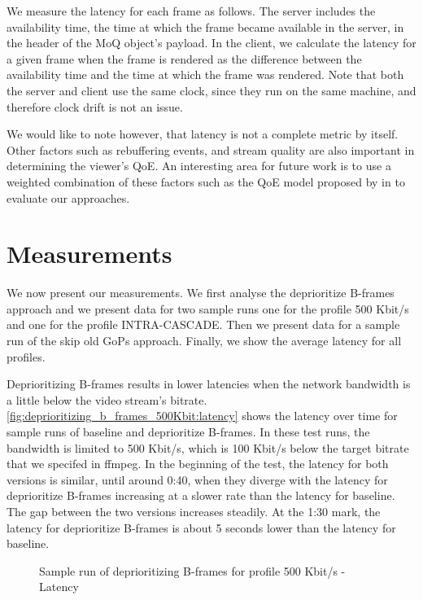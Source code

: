 We measure the latency for each frame as follows. The server includes the availability time, the time at which the frame became available in the server, in the header of the MoQ object's payload. In the client, we calculate the latency for a given frame when the frame is rendered as the difference between the availability time and the time at which the frame was rendered. Note that both the server and client use the same clock, since they run on the same machine, and therefore clock drift is not an issue.

We would like to note however, that latency is not a complete metric by itself. Other factors such as rebuffering events, and stream quality are also important in determining the viewer's \ac{QoE}. An interesting area for future work is to use a weighted combination of these factors such as the \ac{QoE} model proposed by \citeauthor{yinControlTheoreticApproachDynamic2015} in \parencite{yinControlTheoreticApproachDynamic2015} to evaluate our approaches.

\section{Measurements}
We now present our measurements. We first analyse the deprioritize B-frames approach and we present data for two sample runs
one for the profile 500 Kbit/s and one for the profile INTRA-CASCADE. Then we present data for a sample run of the skip old
GoPs approach. Finally, we show the average latency for all profiles. 

Deprioritizing B-frames results in lower latencies when the network bandwidth is a little below the video stream's
bitrate. \autoref{fig:deprioritizing_b_frames_500Kbit:latency} shows the latency over time for sample runs of baseline and
deprioritize B-frames. In these test runs, the bandwidth is limited to 500 Kbit/s, which is 100 Kbit/s below the
target bitrate that we specifed in ffmpeg. In the beginning of the test, the latency for both versions is similar,
until around 0:40, when they diverge with the latency for deprioritize B-frames increasing at a slower rate than
the latency for baseline. The gap between the two versions increases steadily. At the 1:30 mark, the latency for 
deprioritize B-frames is about 5 seconds lower than the latency for baseline.

\begin{figure}
    \centering
    
    \caption{Sample run of deprioritizing B-frames for profile 500 Kbit/s - Latency}
    \label{fig:deprioritizing_b_frames_500Kbit:latency}
\end{figure}


